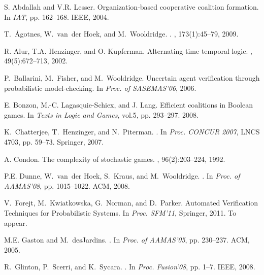 \documentclass{llncs}
\begin{document}
\small{

\begin{thebibliography}{10}
S. Abdallah and V.R. Lesser.
\newblock Organization-based cooperative coalition formation.
\newblock In {\em IAT}, pp. 162--168. IEEE, 2004.

T.~{\AA}gotnes, W.~van~der Hoek, and M.~Wooldridge.
.
, 173(1):45--79, 2009.

R. Alur, T.A. Henzinger, and O. Kupferman.
\newblock Alternating-time temporal logic.
, 49(5):672--713, 2002.

P.~Ballarini, M.~Fisher, and M.~Wooldridge.
\newblock Uncertain agent verification through probabilistic model-checking.
\newblock In {\em Proc. of SASEMAS'06}, 2006.

E. Bonzon, M.-C. Lagasquie-Schiex, and J. Lang.
\newblock Efficient coalitions in {B}oolean games.
\newblock In {\em Texts in Logic and Games}, vol.5, pp. 293--297. 2008.

K.~Chatterjee, T.~Henzinger, and N.~Piterman.
.
\newblock In {\em Proc. CONCUR 2007}, LNCS 4703, pp. 59--73. Springer, 2007.

A. Condon.
\newblock The complexity of stochastic games.
, 96(2):203--224, 1992.

P.E. Dunne, W.~van~der Hoek, S.~Kraus, and M.~Wooldridge.
.
\newblock In {\em Proc. of AAMAS'08}, pp. 1015--1022. ACM, 2008.

V.~Forejt, M.~Kwiatkowska, G.~Norman, and D.~Parker.
\newblock Automated Verification Techniques for Probabilistic Systems.
\newblock In {\em Proc. SFM'11}, Springer, 2011. To appear.

M.E. Gaston and M.~desJardins.
.
\newblock In {\em Proc. of AAMAS'05}, pp. 230--237. ACM, 2005.

R.~Glinton, P.~Scerri, and K.~Sycara.
.
\newblock In {\em Proc. Fusion'08}, pp. 1--7. IEEE, 2008.


\end{thebibliography}}
\end{document}
